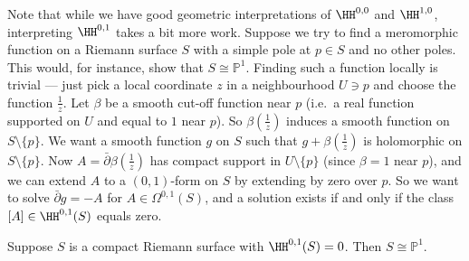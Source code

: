 Note that while we have good geometric interpretations of \(\HH^{0,0}\) and
\(\HH^{1,0}\), interpreting \(\HH^{0,1}\) takes a bit more work. Suppose we try
to find a meromorphic function on a Riemann surface \(S\) with a simple pole at
\(p\in S\) and no other poles. This would, for instance, show that \(S\cong
\mathbb{P}^1\). Finding such a function locally is trivial --- just pick a local
coordinate \(z\) in a neighbourhood \(U\ni p\) and choose the function
\(\frac{1}{z}\). Let \(\beta\) be a smooth cut-off function near \(p\)  (i.e.\ a
real function supported on \(U\) and equal to \(1\) near \(p\)). So \(\beta(\frac{1}{z})\) induces a smooth function on \(S\setminus \{p\}\). We
want a smooth function \(g\) on \(S\) such that \(g+\beta(\frac{1}{z})\) is
holomorphic on \(S\setminus \{p\}\). Now \(A=\bar\partial \beta(\frac{1}{z})\)
has compact support in \(U\setminus \{p\}\) (since \(\beta=1\) near \(p\)),
and we can extend \(A\) to a \((0,1)\)-form on \(S\) by extending by zero
over \(p\). So we want to solve \(\bar \partial g = -A\) for \(A\in
\Omega^{0,1}(S)\), and a solution exists if and only if the class \([A]\in
\HH^{0,1}(S)\) equals zero.

\begin{corollary}
    Suppose \(S\) is a compact Riemann surface with \(\HH^{0,1}(S)=0\). Then
    \(S\cong \mathbb{P}^1\).
\end{corollary}

